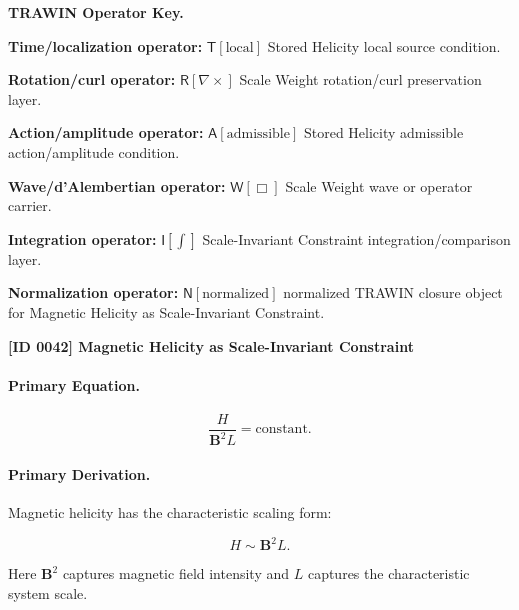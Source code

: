 \par\vspace{0.45\baselineskip}
\noindent\begin{minipage}[t]{\linewidth}
\begingroup
\small
\raggedright
\textbf{TRAWIN Operator Key.}\par
\noindent\textbf{Time/localization operator:} $\mathsf{T}\!\left[\mathrm{local}\right]$ Stored Helicity local source condition.\par
\noindent\textbf{Rotation/curl operator:} $\mathsf{R}\!\left[\nabla\times\right]$ Scale Weight rotation/curl preservation layer.\par
\noindent\textbf{Action/amplitude operator:} $\mathsf{A}\!\left[\mathrm{admissible}\right]$ Stored Helicity admissible action/amplitude condition.\par
\noindent\textbf{Wave/d'Alembertian operator:} $\mathsf{W}\!\left[\Box\right]$ Scale Weight wave or operator carrier.\par
\noindent\textbf{Integration operator:} $\mathsf{I}\!\left[\int\right]$ Scale-Invariant Constraint integration/comparison layer.\par
\noindent\textbf{Normalization operator:} $\mathsf{N}\!\left[\mathrm{normalized}\right]$ normalized TRAWIN closure object for Magnetic Helicity as Scale-Invariant Constraint.\par
\endgroup
\end{minipage}

\clearpage
\noindent\textbf{[ID 0042] Magnetic Helicity as Scale-Invariant Constraint}\par
\vspace{0.35em}
\paragraph{Primary Equation.}
\begin{equation}
\frac{H}{\mathbf{B}^2 L}
=
\mathrm{constant}.
\end{equation}

\paragraph{Primary Derivation.}
Magnetic helicity has the characteristic scaling form:

\begin{equation}
H
\sim
\mathbf{B}^2 L .
\end{equation}

Here $\mathbf{B}^2$ captures magnetic field intensity and $L$ captures the characteristic system scale.

